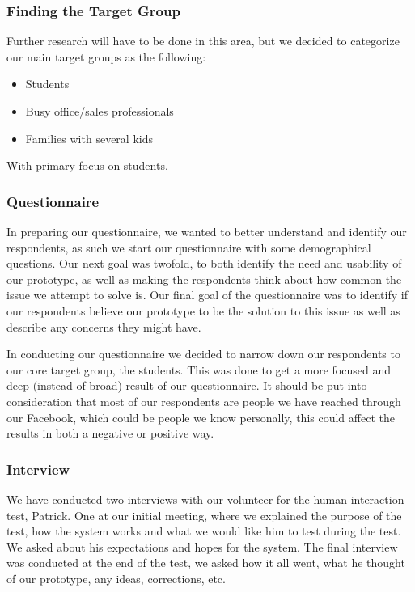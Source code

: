 \documentclass{ubicomp2012}
\begin{document}
\subsubsection{Finding the Target Group}
Further research will have to be done in this area, but we decided to categorize our main target groups as the following:
\begin{itemize}
  \item Students
  \item Busy office/sales professionals 
  \item Families with several kids
\end{itemize}
With primary focus on students.

\subsubsection{Questionnaire}
In preparing our questionnaire, we wanted to better understand and identify our respondents, as such we start our questionnaire with some demographical questions. Our next goal was twofold, to both identify the need and usability of our prototype, as well as making the respondents think about how common the issue we attempt to solve is. Our final goal of the questionnaire was to identify if our respondents believe our prototype to be the solution to this issue as well as describe any concerns they might have.

In conducting our questionnaire we decided to narrow down our respondents to our core target group, the students. This was done to get a more focused and deep (instead of broad) result of our questionnaire.
It should be put into consideration that most of our respondents are people we have reached through our Facebook, which could be people we know personally, this could affect the results in both a negative or positive way.

\subsubsection{Interview}
We have conducted two interviews with our volunteer for the human interaction test, Patrick. One at our initial meeting, where we explained the purpose of the test, how the system works and what we would like him to test during the test. We asked about his expectations and hopes for the system.
The final interview was conducted at the end of the test, we asked how it all went, what he thought of our prototype, any ideas, corrections, etc.
\end{document}
